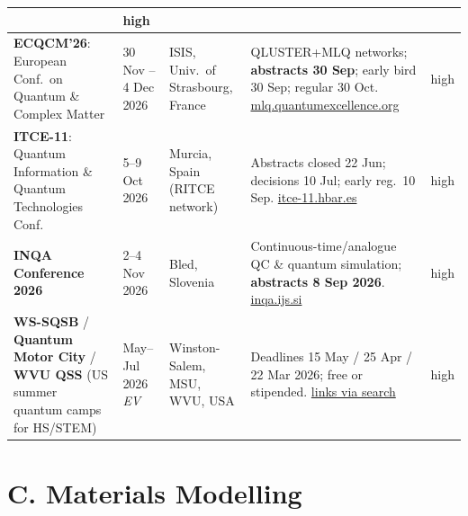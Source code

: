 \documentclass[11pt,a4paper]{article}
\newcommand{\ev}{\emph{EV}}
\begin{document}
\begin{longtable}{@{}p{3.2cm}p{3.0cm}p{2.5cm}p{5.2cm}p{1.6cm}@{}}
  & high \\
\midrule
\textbf{ECQCM'26}: European Conf.\ on Quantum \& Complex Matter
  & 30 Nov -- 4 Dec 2026
  & ISIS, Univ.\ of Strasbourg, France
  & QLUSTER+MLQ networks; \textbf{abstracts 30 Sep}; early bird 30 Sep; regular 30 Oct. \href{https://mlq.quantumexcellence.org/ecqcm26/}{mlq.quantumexcellence.org}
  & high \\
\midrule
\textbf{ITCE-11}: Quantum Information \& Quantum Technologies Conf.
  & 5--9 Oct 2026
  & Murcia, Spain (RITCE network)
  & Abstracts closed 22 Jun; decisions 10 Jul; early reg.\ 10 Sep. \href{https://itce-11.hbar.es/}{itce-11.hbar.es}
  & high \\
\midrule
\textbf{INQA Conference 2026}
  & 2--4 Nov 2026
  & Bled, Slovenia
  & Continuous-time/analogue QC \& quantum simulation; \textbf{abstracts 8 Sep 2026}. \href{https://inqa.ijs.si/}{inqa.ijs.si}
  & high \\
\midrule
\textbf{WS-SQSB} / \textbf{Quantum Motor City} / \textbf{WVU QSS} (US summer quantum camps for HS/STEM)
  & May--Jul 2026 \ev{}
  & Winston-Salem, MSU, WVU, USA
  & Deadlines 15 May / 25 Apr / 22 Mar 2026; free or stipended. \href{https://www.sandia.gov/quantum/qcamp-students/}{links via search}
  & high \\
\bottomrule
\end{longtable}

\section{C. Materials Modelling}
\end{document}

